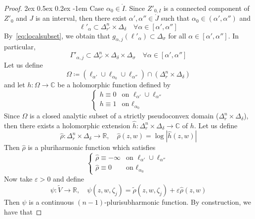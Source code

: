 \documentclass[reqno,oneside]{amsart}
\makeatletter
\newcommand{\numberset}{\mathbb}
\newcommand{\R}{\numberset{R}}
\newcommand{\C}{\numberset{C}}
\renewcommand{\epsilon}{\varepsilon}
\theoremstyle{definition}
\theoremstyle{plain}
\theoremstyle{remark}
\renewcommand{\paragraph}{
		\@startsection{paragraph}{4}
		{\z@}
		{2ex \@plus 0.5ex \@minus 0.2ex}
		{-1em}
		{\normalfont\bfseries}
	}
\makeatother
\begin{document}
\begin{proof}
	\paragraph{Case {\boldmath $\alpha_0\in\mathring{I}$}.} Since $Z'_{0,I}$ is a connected component of $Z'_0$ and $J$ is an interval, then there exist $\alpha',\alpha''\in\mathring{J}$ such that $\alpha_0\in(\alpha',\alpha'')$ and 
    \begin{equation}
    \label{eq:local_inclusion}
    	\ell'_\alpha\subset\Delta_{r'}^n\times\Delta_\delta \quad \forall\alpha\in[\alpha',\alpha'']
    \end{equation}
    By~\eqref{eq:localsubset}, we obtain that $g_{\alpha,j}(\ell'_\alpha)\subset\Delta_\sigma$ for all $\alpha\in[\alpha',\alpha'']$. In particular,
    \begin{equation}
    \label{eq:localinclusion}
        \Gamma'_{\alpha,j}\subset\Delta_{r'}^n\times\Delta_\delta\times\Delta_\sigma \quad \forall\alpha\in[\alpha',\alpha'']
    \end{equation}
    Let us define
    \[
        \Omega\coloneqq(\ell_{\alpha'}\cup\ell_{\alpha_0}\cup\ell_{\alpha''})\cap(\Delta_r^n\times\Delta_\delta)
    \]
    and let $h:\Omega\to\C$ be a holomorphic function defined by
    \[
        \begin{cases}
            h\equiv0 & \text{on $\ell_{\alpha'}\cup\ell_{\alpha''}$} \\
            h\equiv1 & \text{on $\ell_{\alpha_0}$}
        \end{cases}
    \]
    Since $\Omega$ is a closed analytic subset of a strictly pseudoconvex domain ($\Delta_r^n\times\Delta_\delta$), then there exists a holomorphic extension $\hat{h}:\Delta_r^n\times\Delta_\delta\to\C$ of $h$. Let us define
    \[
        \hat\rho:\Delta_r^n\times\Delta_\delta\to\R, \quad \hat\rho(z,w)=\log|\hat{h}(z,w)|
    \]
    Then $\hat\rho$ is a pluriharmonic function which satisfies
    \begin{equation}
    \label{eq:cases1}
        \begin{cases}
            \hat\rho\equiv-\infty & \text{on $\ell_{\alpha'}\cup\ell_{\alpha''}$} \\
            \hat\rho\equiv0 & \text{on $\ell_{\alpha_0}$}
        \end{cases}
    \end{equation}
    Now take $\epsilon>0$ and define
    \[
        \psi:\tilde{V}\to\R, \quad \psi(z,w,\zeta_j)=\tilde\rho(z,w,\zeta_j)+\epsilon\hat\rho(z,w)
    \]
    Then $\psi$ is a continuous $(n-1)$-plurisubharmonic function. By construction, we have that

\end{proof}
\end{document}

